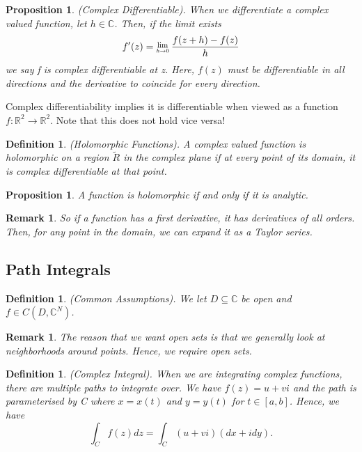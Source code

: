 \documentclass[twoside]{article}
\newcommand{\Lim}[1]{\raisebox{0.5ex}{\scalebox{0.8}{$\displaystyle \lim_{#1}\;$}}}
\newtheorem{proposition}[theorem]{Proposition}
\newtheorem{remark}[theorem]{Remark}
\newtheorem{definition}[theorem]{Definition}
\begin{document}
\begin{proposition}(Complex Differentiable). When we differentiate a complex valued function, let $h \in \mathbb{C}$. Then, if the limit exists
$$
f'(z) = \Lim{h \rightarrow 0}\frac{f(z+h) - f(z)}{h}
$$
we say f is complex differentiable at z. Here, $f(z)$ must be differentiable in all directions and the derivative to coincide for every direction.
\end{proposition}

Complex differentiability implies it is differentiable when viewed as a function $f: \mathbb{R}^2 \rightarrow \mathbb{R}^2$. Note that this does not hold vice versa!

\begin{definition}(Holomorphic Functions). A complex valued function is holomorphic on a region $\tilde{R}$ in the complex plane if at every point of its domain, it is complex differentiable at that point.
\end{definition}

\begin{proposition} A function is holomorphic if and only if it is analytic. 
\end{proposition}

\begin{remark} So if a function has a first derivative, it has derivatives of all orders. Then, for any point in the domain, we can expand it as a Taylor series. 
\end{remark}

\subsection{Path Integrals}

\begin{definition}(Common Assumptions). We let $D \subseteq \mathbb{C}$ be open and $f \in C(D, \mathbb{C}^N)$.
\end{definition}

\begin{remark} The reason that we want open sets is that we generally look at neighborhoods around points. Hence, we require open sets.
\end{remark}

\begin{definition}(Complex Integral). When we are integrating complex functions, there are multiple paths to integrate over. We have $f(z) = u+vi$ and the path is parameterised by C where $x = x(t)$ and $y = y(t)$ for $t \in [a,b]$. Hence, we have 
$$
\int_Cf(z)dz = \int_C(u + vi)(dx + idy).
$$
\end{definition}
\end{document}
